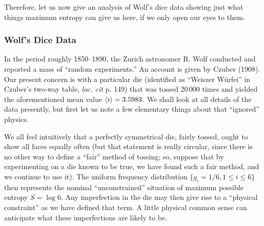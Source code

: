 Therefore, let us now give an analysis of Wolf's dice data showing just what things maximum entropy can give us here, if we only open our eyes to them.


\subsubsection{Wolf's Dice Data}
In the period roughly 1850--1890, the Zurich astronomer R. Wolf conducted and reported a mass of ``random experiments.''
An account is given by Czuber (\cite{czuber}{1908}).
Our present concern is with a particular die (identified as ``Weiszer Würfei'' in Czuber's two-way table, \emph{loc. cit} p. 149) that was tossed $20\,000$ times and yielded the aforementioned mean value $\langle i\rangle = 3.5983$.
We shall look at all details of the data presently, but first let us note a few elementary things about that ``ignored'' physics.

We all feel intuitively that a perfectly symmetrical die, fairly tossed, ought to show all faces equally often (but that statement is really circular, since there is no other way to define a ``fair'' method of tossing; so, suppose that by experimenting on a die known to be true, we have found such a fair method, and we continue to use it).
The uniform frequency distribution $\{g_i = 1/6, 1\leq i\leq 6\}$ then represents the nominal ``unconstrained'' situation of maximum possible entropy $S = \log 6$.
Any imperfection in the die may then give rise to a ``physical constraint'' as we have defined that term.
A little physical common sense can anticipate what these imperfections are likely to be.

